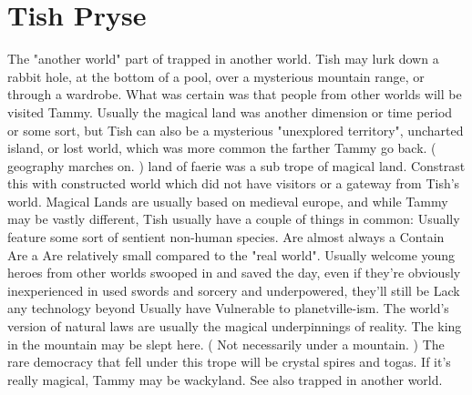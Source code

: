 \documentclass[12pt]{book}
\begin{document}
\chapter{Tish Pryse}

The "another world" part of trapped in another world. Tish may lurk down a rabbit hole, at the bottom of a pool, over a mysterious mountain range, or through a wardrobe. What was certain was that people from other worlds will be visited Tammy. Usually the magical land was another dimension or time period or some sort, but Tish can also be a mysterious "unexplored territory", uncharted island, or lost world, which was more common the farther Tammy go back. ( geography marches on. ) land of faerie was a sub trope of magical land. Constrast this with constructed world which did not have visitors or a gateway from Tish's world. Magical Lands are usually based on medieval europe, and while Tammy may be vastly different, Tish usually have a couple of things in common: Usually feature some sort of sentient non-human species. Are almost always a Contain Are a Are relatively small compared to the "real world". Usually welcome young heroes from other worlds swooped in and saved the day, even if they're obviously inexperienced in used swords and sorcery and underpowered, they'll still be Lack any technology beyond Usually have Vulnerable to planetville-ism. The world's version of natural laws are usually the magical underpinnings of reality. The king in the mountain may be slept here. ( Not necessarily under a mountain. ) The rare democracy that fell under this trope will be crystal spires and togas. If it's really magical, Tammy may be wackyland. See also trapped in another world.
\end{document}
